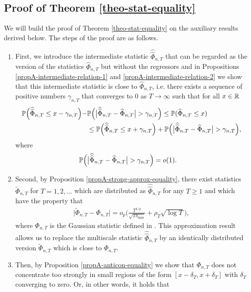 \documentclass[a4paper,12pt]{article}
\makeatletter
\renewcommand{\eqref}[1]{\tagform@{\ref{#1}}}
\newcommand{\doublehattwo}[1]{\widehat{\widehat{#1}}}
\makeatother
\begin{document}
\subsection{Proof of Theorem \ref{theo-stat-equality}}\label{subsec-appendix-stat-equality}

We will build the proof of Theorem \ref{theo-stat-equality} on the auxiliary results derived below. The steps of the proof are as follows.
\begin{enumerate}
\item First, we introduce the intermediate statistic $\doublehattwo{\Phi}_{n, T}$ that can be regarded as the version of the statistics $\widehat{\Phi}_{n, T}$ but without the regressors and in Propositions \ref{propA-intermediate-relation-1} and \ref{propA-intermediate-relation-2} we show that this intermediate statistic is close to $\widehat{\Phi}_{n, T}$, i.e. there exists a sequence of positive numbers $\gamma_{n, T}$ that converges to $0$ as $T \to \infty$ such that for all $x\in \mathbb{R}$ 
\begin{align*}
\pr\Big(\doublehattwo{\Phi}_{n,T} \le x - \gamma_{n, T}\Big) - &\pr \Big(\big|\doublehattwo{\Phi}_{n,T} - \widehat{\Phi}_{n,T}\big| > \gamma_{n, T} \Big)\le \pr(\widehat{\Phi}_{n, T} \le x) \\
&\le\pr\Big(\doublehattwo{\Phi}_{n,T} \le x + \gamma_{n, T}\Big) + \pr \Big(\big|\doublehattwo{\Phi}_{n,T} - \widehat{\Phi}_{n,T}\big| > \gamma_{n, T} \Big),
\end{align*}
where
\begin{align*} \pr \Big(\big|\doublehattwo{\Phi}_{n,T} &- \widehat{\Phi}_{n,T}\big| > \gamma_{n, T} \Big) = o(1).
\end{align*}
\item Second, by Proposition \ref{propA-strong-approx-equality}, there exist statistics $\widetilde{\Phi}_{n, T}$ for $T = 1,2,\ldots$ which are distributed as $\doublehattwo{\Phi}_{n, T}$ for any $T \ge 1$ and which have the property that 
\begin{align*}
\big| \widetilde{\Phi}_{n, T} - \Phi_{n,T} \big| = o_p \Big( \frac{T^{1/q}}{\sqrt{T h_{\min}}} + \rho_T\sqrt{\log T} \Big),
\end{align*}
where $\Phi_{n, T}$ is the Gaussian statistic defined in \eqref{Phi-statistic}. This approximation result allows us to replace the multiscale statistic $\doublehattwo{\Phi}_{n, T}$ by an identically distributed version $\widetilde{\Phi}_{n, T}$ which is close to $\Phi_{n, T}$.
\item Then, by Proposition \ref{propA-anticon-equality} we show that $\Phi_{n,T}$ does not concentrate too strongly in small regions of the form $[x-\delta_T,x+\delta_T]$ with $\delta_T$ converging to zero. Or, in other words, it holds that 

\end{enumerate}
\end{document}
